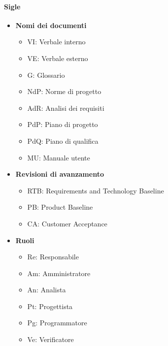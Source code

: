\paragraph{Sigle}
\begin{itemize}
        \item \textbf{Nomi dei documenti}
                \begin{itemize}
                        \item VI: Verbale interno
                        \item VE: Verbale esterno
                        \item G: Glossario
                        \item NdP: Norme di progetto
                        \item AdR: Analisi dei requisiti
                        \item PdP: Piano di progetto
                        \item PdQ: Piano di qualifica
                        \item MU: Manuale utente
                \end{itemize}
        \item \textbf{Revisioni di avanzamento}
                \begin{itemize}
                        \item RTB: Requirements and Technology Baseline
                        \item PB: Product Baseline
                        \item CA: Customer Acceptance
                \end{itemize}
        \item \textbf{Ruoli}
                \begin{itemize}
                        \item Re: Responsabile
                        \item Am: Amministratore
                        \item An: Analista
                        \item Pt: Progettista
                        \item Pg: Programmatore
                        \item Ve: Verificatore
                \end{itemize}
\end{itemize}

